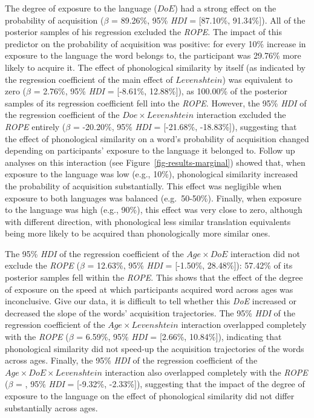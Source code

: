 \documentclass[
  letterpaper,
  DIV=11,
  numbers=noendperiod]{scrartcl}
\begin{document}
The degree of exposure to the language (\(DoE\)) had a strong effect on
the probability of acquisition (\(\beta\) = 89.26\%, 95\% \emph{HDI} =
{[}87.10\%, 91.34\%{]}). All of the posterior samples of his regression
excluded the \emph{ROPE}. The impact of this predictor on the
probability of acquisition was positive: for every 10\% increase in
exposure to the language the word belongs to, the participant was
29.76\% more likely to acquire it. The effect of phonological similarity
by itself (as indicated by the regression coefficient of the main effect
of \(Levenshtein\)) was equivalent to zero (\(\beta\) = 2.76\%, 95\%
\emph{HDI} = {[}-8.61\%, 12.88\%{]}), as 100.00\% of the posterior
samples of its regression coefficient fell into the \emph{ROPE}.
However, the 95\% \emph{HDI} of the regression coefficient of the
\(Doe \times Levenshtein\) interaction excluded the \emph{ROPE} entirely
(\(\beta\) = -20.20\%, 95\% \emph{HDI} = {[}-21.68\%, -18.83\%{]}),
suggesting that the effect of phonological similarity on a word's
probability of acquisition changed depending on participants' exposure
to the language it belonged to. Follow up analyses on this interaction
(see Figure~\ref{fig-results-marginal}) showed that, when exposure to
the language was low (e.g., 10\%), phonological similarity increased the
probability of acquisition substantially. This effect was negligible
when exposure to both languages was balanced (e.g.~50-50\%). Finally,
when exposure to the language was high (e.g., 90\%), this effect was
very close to zero, although with different direction, with phonological
less similar translation equivalents being more likely to be acquired
than phonologically more similar ones.

The 95\% \emph{HDI} of the regression coefficient of the
\(Age \times DoE\) interaction did not exclude the \emph{ROPE}
(\(\beta\) = 12.63\%, 95\% \emph{HDI} = {[}-1.50\%, 28.48\%{]}): 57.42\%
of its posterior samples fell within the \emph{ROPE}. This shows that
the effect of the degree of exposure on the speed at which participants
acquired word across ages was inconclusive. Give our data, it is
difficult to tell whether this \emph{DoE} increased or decreased the
slope of the words' acquisition trajectories. The 95\% \emph{HDI} of the
regression coefficient of the \(Age \times Levenshtein\) interaction
overlapped completely with the \emph{ROPE} (\(\beta\) = 6.59\%, 95\%
\emph{HDI} = {[}2.66\%, 10.84\%{]}), indicating that phonological
similarity did not speed-up the acquisition trajectories of the words
across ages. Finally, the 95\% \emph{HDI} of the regression coefficient
of the \(Age \times DoE \times Levenshtein\) interaction also overlapped
completely with the \emph{ROPE} (\(\beta\) = , 95\% \emph{HDI} =
{[}-9.32\%, -2.33\%{]}), suggesting that the impact of the degree of
exposure to the language on the effect of phonological similarity did
not differ substantially across ages.
\end{document}
